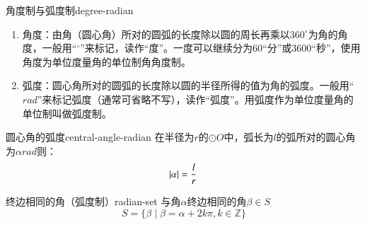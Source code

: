 \begin{definition}{角度制与弧度制}{degree-radian}
\begin{enumerate}
\item 角度：由角（圆心角）所对的\textcolor{third}{圆弧的长度}除以\textcolor{third}{圆的周长}再乘以\textcolor{third}{$360^{\circ}$}为角的角度，一般用“${}^{\circ} $”来标记，读作“度”。一度可以继续分为60“分”或3600“秒”，使用角度为单位度量角的单位制角角度制。

\item 弧度：圆心角所对的\textcolor{third}{圆弧的长度}除以\textcolor{third}{圆的半径}所得的值为角的弧度。一般用“$rad$”来标记弧度（通常可省略不写），读作“弧度”。用弧度作为单位度量角的单位制叫做\textcolor{third}{弧度制}。
\end{enumerate}
\end{definition}
%

\begin{definition}{圆心角的弧度}{central-angle-radian}
在半径为$r$的$\odot O$中，弧长为$l$的弧所对的圆心角为$\alpha rad$则：
\begin{equation}
\displaystyle \abs{\alpha} = \frac{l}{r}
\end{equation}
\end{definition}

\begin{definition}{终边相同的角（弧度制）}{radian-set}
与角$\alpha$终边相同的角$\beta \in S$
\begin{equation}
S = \{\beta \mid \beta = \alpha + 2k\pi, k \in \mathbb{Z}\}
\end{equation}
\end{definition}

